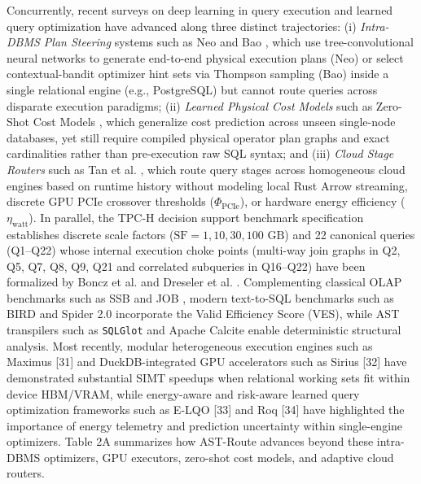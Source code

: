 \documentclass[10pt,a4paper]{article}
\begin{document}
Concurrently, recent surveys on deep learning in query execution \cite{milicevic2024dlquery} and learned query optimization have advanced along three distinct trajectories: (i) \emph{Intra-DBMS Plan Steering} systems such as Neo \cite{marcus2019neo} and Bao \cite{marcus2021bao}, which use tree-convolutional neural networks to generate end-to-end physical execution plans (Neo) or select contextual-bandit optimizer hint sets via Thompson sampling (Bao) inside a single relational engine (e.g., PostgreSQL) but cannot route queries across disparate execution paradigms; (ii) \emph{Learned Physical Cost Models} such as Zero-Shot Cost Models \cite{hilprecht2022zeroshot}, which generalize cost prediction across unseen single-node databases, yet still require compiled physical operator plan graphs and exact cardinalities rather than pre-execution raw SQL syntax; and (iii) \emph{Cloud Stage Routers} such as Tan et al. \cite{tan2023stage}, which route query stages across homogeneous cloud engines based on runtime history without modeling local Rust Arrow streaming, discrete GPU PCIe crossover thresholds ($\Phi_{\text{PCIe}}$), or hardware energy efficiency ($\eta_{\text{watt}}$). In parallel, the TPC-H decision support benchmark specification \cite{tpc2022tpch} establishes discrete scale factors ($\text{SF}=1, 10, 30, 100\text{ GB}$) and 22 canonical queries (Q1--Q22) whose internal execution choke points (multi-way join graphs in Q2, Q5, Q7, Q8, Q9, Q21 and correlated subqueries in Q16--Q22) have been formalized by Boncz et al. \cite{boncz2014tpch} and Dreseler et al. \cite{dreseler2020quantifying}. Complementing classical OLAP benchmarks such as SSB \cite{oneil2009ssb} and JOB \cite{leis2015job}, modern text-to-SQL benchmarks such as BIRD \cite{li2023bird} and Spider 2.0 \cite{lei2025spider2} incorporate the Valid Efficiency Score (VES), while AST transpilers such as \texttt{SQLGlot} \cite{mao2024sqlglot} and Apache Calcite \cite{begoli2018calcite} enable deterministic structural analysis. Most recently, modular heterogeneous execution engines such as Maximus [31] and DuckDB-integrated GPU accelerators such as Sirius [32] have demonstrated substantial SIMT speedups when relational working sets fit within device HBM/VRAM, while energy-aware and risk-aware learned query optimization frameworks such as E-LQO [33] and Roq [34] have highlighted the importance of energy telemetry and prediction uncertainty within single-engine optimizers. Table 2A summarizes how AST-Route advances beyond these intra-DBMS optimizers, GPU executors, zero-shot cost models, and adaptive cloud routers.
\end{document}
